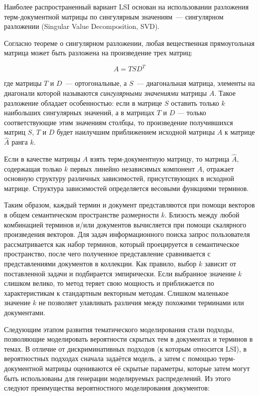 Наиболее распространенный вариант LSI основан на использовании разложения терм-документной матрицы по сингулярным значениям~--- сингулярном разложении (Singular Value Decomposition, SVD). 


Согласно теореме о сингулярном разложении, любая вещественная прямоугольная матрица может быть разложена на произведение трех матриц:

\begin{equation}\label{}
A=TSD^T
\end{equation}

\noindent
где матрицы $T$ и $D$~--- ортогональные, а $S$~--- диагональная матрица, элементы на диагонали которой называются \textit{сингулярными значениями} матрицы $A$. Такое разложение обладает особенностью: если в матрице $S$ оставить только $k$ наибольших сингулярных значений, а в матрицах $T$ и $D$ — только соответствующие этим значениям столбцы, то произведение получившихся матриц $S$, $T$ и $D$ будет наилучшим приближением исходной матрицы $A$ к матрице $\widehat{A}$ ранга $k$. 

Если в качестве матрицы $A$ взять терм-документную матрицу, то матрица $\widehat{A}$, содержащая только $k$ первых линейно независимых компонент $A$, отражает основную структуру различных зависимостей, присутствующих в исходной матрице. Структура зависимостей определяется весовыми функциями терминов.

Таким образом, каждый термин и документ представляются при помощи векторов в общем семантическом пространстве размерности $k$. Близость между любой комбинацией терминов и/или документов вычисляется при помощи скалярного произведения векторов. Для задач информационного поиска запрос пользователя рассматривается как набор терминов, который проецируется в семантическое пространство, после чего полученное представление сравнивается с представлениями документов в коллекции. Как правило, выбор $k$ зависит от поставленной задачи и подбирается эмпирически. Если выбранное значение $k$ слишком велико, то метод теряет свою мощность и приближается по характеристикам к стандартным векторным методам. Слишком маленькое значение $k$ не позволяет улавливать различия между похожими терминами или документами. 

Следующим этапом развития тематического моделирования стали подходы, позволяющие моделировать вероятности скрытых тем в документах и терминов в темах. В отличие от дискриминативных подходов (к которым относится LSI), в вероятностных подходах сначала задаётся модель, а затем с помощью терм-документной матрицы оцениваются её скрытые параметры, которые затем могут быть использованы для генерации моделируемых распределений. Из этого следуют преимущества вероятностного моделирования документов:


